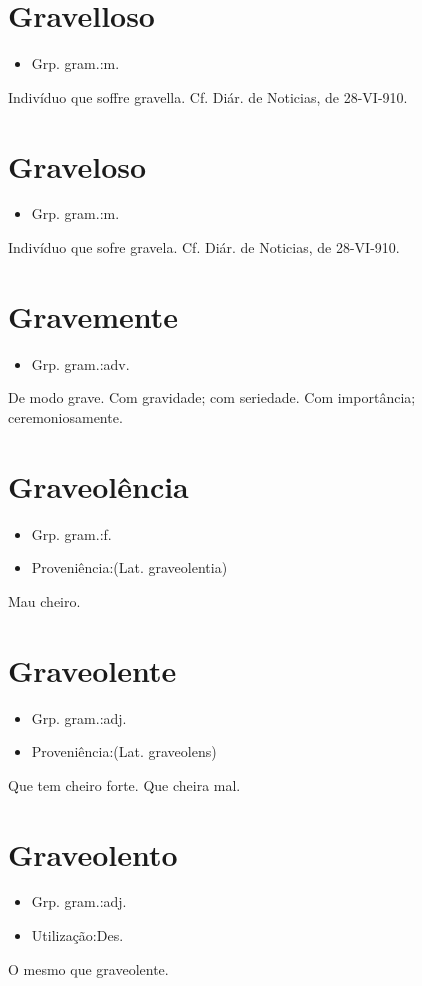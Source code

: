 \section{Gravelloso}
\begin{itemize}
\item {Grp. gram.:m.}
\end{itemize}
Indivíduo que soffre gravella. Cf. \textunderscore Diár. de Noticias\textunderscore , de 28-VI-910.
\section{Graveloso}
\begin{itemize}
\item {Grp. gram.:m.}
\end{itemize}
Indivíduo que sofre gravela. Cf. \textunderscore Diár. de Noticias\textunderscore , de 28-VI-910.
\section{Gravemente}
\begin{itemize}
\item {Grp. gram.:adv.}
\end{itemize}
De modo grave.
Com gravidade; com seriedade.
Com importância; ceremoniosamente.
\section{Graveolência}
\begin{itemize}
\item {Grp. gram.:f.}
\end{itemize}
\begin{itemize}
\item {Proveniência:(Lat. \textunderscore graveolentia\textunderscore )}
\end{itemize}
Mau cheiro.
\section{Graveolente}
\begin{itemize}
\item {Grp. gram.:adj.}
\end{itemize}
\begin{itemize}
\item {Proveniência:(Lat. \textunderscore graveolens\textunderscore )}
\end{itemize}
Que tem cheiro forte.
Que cheira mal.
\section{Graveolento}
\begin{itemize}
\item {Grp. gram.:adj.}
\end{itemize}
\begin{itemize}
\item {Utilização:Des.}
\end{itemize}
O mesmo que \textunderscore graveolente\textunderscore .
